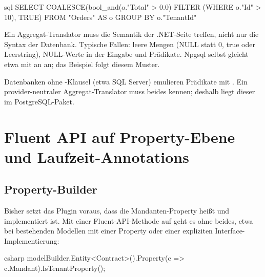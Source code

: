 \begin{sourcecode}[Erzeugtes SQL für g.\allowbreak{}Where(\allowbreak{}o => o.\allowbreak{}Id > 10).\allowbreak{}Select(\allowbreak{}o => o.\allowbreak{}Total > 0)]{sql}
SELECT COALESCE(bool_and(o."Total" > 0.0) FILTER (WHERE o."Id" > 10), TRUE)
FROM "Orders" AS o
GROUP BY o."TenantId"
\end{sourcecode}

\begin{important}
  Ein Aggregat-Translator muss die Semantik der .NET-Seite treffen, nicht nur die Syntax der
  Datenbank. Typische Fallen: leere Mengen (NULL statt 0, true oder Leerstring), NULL-Werte
  in der Eingabe und Prädikate. Npgsql selbst gleicht etwa 
  mit  an  an; das Beispiel folgt diesem
  Muster.
\end{important}

Datenbanken ohne -Klausel (etwa SQL Server) emulieren Prädikate mit . Ein provider-neutraler Aggregat-Translator muss beides kennen;
deshalb liegt dieser im PostgreSQL-Paket.

\chapter{Fluent API auf Property-Ebene und Laufzeit-Annotations}\label{ch:property-level-fluent-api-and}

\section{Property-Builder}

Bisher setzt das Plugin voraus, dass die Mandanten-Property 
heißt und  implementiert ist. Mit einer Fluent-API-Methode
auf  geht es ohne beides, etwa bei bestehenden Modellen
mit einer Property  oder einer expliziten
Interface-Implementierung:

\begin{sourcecode}[Anwendung]{csharp}
modelBuilder.Entity<Contract>().Property(c => c.Mandant).IsTenantProperty();
\end{sourcecode}

